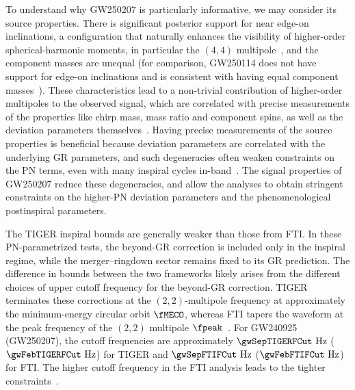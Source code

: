 To understand why \ac{GW250207} is particularly informative, we may consider its source properties.
There is significant posterior support for near edge-on inclinations, a configuration that naturally enhances the visibility of higher-order spherical-harmonic moments, in particular the $(4,4)$ multipole~\cite{Mills:2020thr}, and the component masses are unequal (for comparison, \ac{GW250114} does not have support for edge-on inclinations and is consistent with having equal component masses~\cite{KAGRA:2025oiz}).
These characteristics lead to a non-trivial contribution of higher-order multipoles to the observed signal, which are correlated with precise measurements of the properties like chirp mass, mass ratio and component spins, as well as the deviation parameters themselves~\cite{Abbott:2020jks,Roy:2025gzv}.
Having precise measurements of the source properties is beneficial because deviation parameters are correlated with the underlying \ac{GR} parameters, and such degeneracies often weaken constraints on the \ac{PN} terms, even with many inspiral cycles in-band~\cite{LIGOScientific:2018dkp,Sanger:2024axs}.
The signal properties of \ac{GW250207} reduce these degeneracies, and allow the analyses to obtain stringent constraints on the higher-\ac{PN} deviation parameters and the phenomenological postinspiral parameters.

The \ac{TIGER} inspiral bounds are generally weaker than those from \ac{FTI}.
In these \ac{PN}-parametrized tests, the beyond-\ac{GR} correction is included only in the inspiral regime, while the merger--ringdown sector remains fixed to its \ac{GR} prediction.
The difference in bounds between the two frameworks likely arises from the different choices of upper cutoff frequency for the beyond-\ac{GR} correction.
\ac{TIGER} terminates these corrections at the $(2,2)$-multipole frequency at approximately the minimum-energy circular orbit $\fMECO$, whereas \ac{FTI} tapers the waveform at the peak frequency of the $(2,2)$ multipole $\fpeak$~\cite{LIGOScientific:2018dkp,Mehta:2022pcn,Roy:2025gzv}.
For \ac{GW240925} (\ac{GW250207}), the cutoff frequencies are approximately $\gwSepTIGERFCut~\mathrm{Hz}$ ($\gwFebTIGERFCut~\mathrm{Hz}$) for \ac{TIGER} and $\gwSepFTIFCut~\mathrm{Hz}$ ($\gwFebFTIFCut~\mathrm{Hz}$) for \ac{FTI}.
The higher cutoff frequency in the \ac{FTI} analysis leads to the tighter constraints~\cite{LIGOScientific:2026fcf}.

